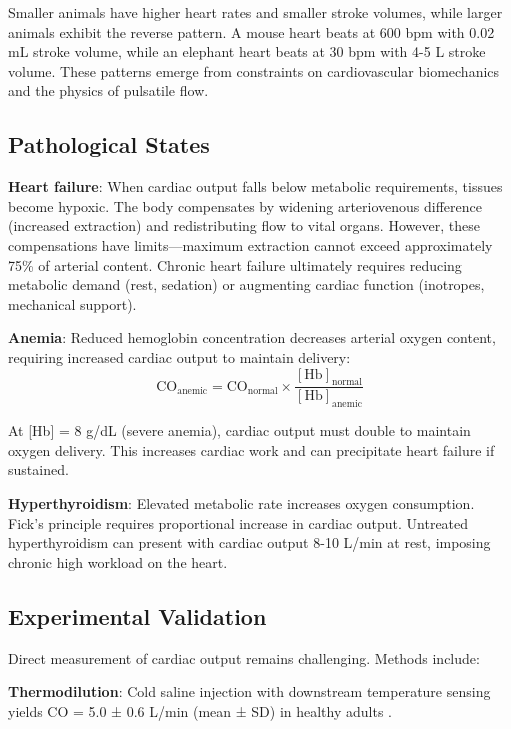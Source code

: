 \documentclass[10pt,twocolumn,a4paper]{article}
\theoremstyle{remark}
\begin{document}
Smaller animals have higher heart rates and smaller stroke volumes, while larger animals exhibit the reverse pattern. A mouse heart beats at 600 bpm with 0.02 mL stroke volume, while an elephant heart beats at 30 bpm with 4-5 L stroke volume. These patterns emerge from constraints on cardiovascular biomechanics and the physics of pulsatile flow.

\subsection{Pathological States}

\textbf{Heart failure}: When cardiac output falls below metabolic requirements, tissues become hypoxic. The body compensates by widening arteriovenous difference (increased extraction) and redistributing flow to vital organs. However, these compensations have limits—maximum extraction cannot exceed approximately 75\% of arterial content. Chronic heart failure ultimately requires reducing metabolic demand (rest, sedation) or augmenting cardiac function (inotropes, mechanical support).

\textbf{Anemia}: Reduced hemoglobin concentration decreases arterial oxygen content, requiring increased cardiac output to maintain delivery:
\begin{equation}
\mathrm{CO}_{\mathrm{anemic}} = \mathrm{CO}_{\mathrm{normal}} \times \frac{[\mathrm{Hb}]_{\mathrm{normal}}}{[\mathrm{Hb}]_{\mathrm{anemic}}}
\end{equation}

At [Hb] = 8 g/dL (severe anemia), cardiac output must double to maintain oxygen delivery. This increases cardiac work and can precipitate heart failure if sustained.

\textbf{Hyperthyroidism}: Elevated metabolic rate increases oxygen consumption. Fick's principle requires proportional increase in cardiac output. Untreated hyperthyroidism can present with cardiac output 8-10 L/min at rest, imposing chronic high workload on the heart.

\subsection{Experimental Validation}

Direct measurement of cardiac output remains challenging. Methods include:

\textbf{Thermodilution}: Cold saline injection with downstream temperature sensing yields CO = 5.0 ± 0.6 L/min (mean ± SD) in healthy adults \cite{ganz1971new}.
\end{document}
